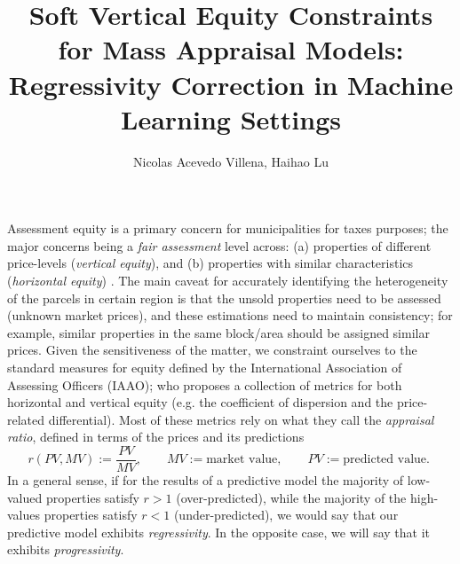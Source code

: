 \documentclass[11pt]{article}
\title{Soft Vertical Equity Constraints for Mass Appraisal Models:\\ Regressivity Correction in Machine Learning Settings \vspace{-2mm}}
\author{Nicolas Acevedo Villena, Haihao Lu}
\date{
\vspace{-10mm}
}
\theoremstyle{plain}
\theoremstyle{definition}
\newcommand{\1}{\mathbf{1}}
\begin{document}
\maketitle






Assessment equity is a primary concern for municipalities for taxes purposes; the major concerns being a \textit{fair assessment} level across: (a) properties of different price-levels (\textit{vertical equity}), and (b) properties with similar characteristics (\textit{horizontal equity}) \cite{quintos2014improving}. The main caveat for accurately identifying the heterogeneity of the parcels in certain region is that the unsold properties need to be assessed (unknown market prices), and these estimations need to maintain consistency; for example, similar properties in the same block/area should be assigned similar prices. Given the sensitiveness of the matter, we constraint ourselves to the standard measures for equity defined by the International Association of Assessing Officers (IAAO); who proposes a collection of metrics for both horizontal and vertical equity \cite{iaao2025ratio} (e.g. the coefficient of dispersion and the price-related differential). Most of these metrics rely on what they call the \textit{appraisal ratio}, defined in terms of the prices and its predictions
$$r(PV, MV):= \frac{PV}{MV}, \qquad {MV}:= \text{market value}, \qquad PV:= \text{predicted value. }$$
In a general sense, if for the results of a predictive model the majority of low-valued properties satisfy $r > 1$ (over-predicted), while the majority of the high-values properties satisfy $r < 1$ (under-predicted), we would say that our predictive model exhibits \textit{regressivity}. In the opposite case, we will say that it exhibits \textit{progressivity}. 
\end{document}
